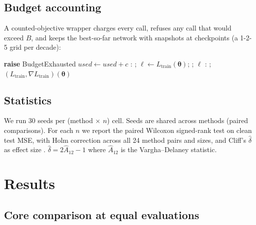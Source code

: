\documentclass[11pt]{article}
\newcommand{\B}{B}
\newcommand{\Ltr}{L_{\mathrm{train}}}
\begin{document}
\subsection{Budget accounting}

A counted-objective wrapper charges every call, refuses any call that would exceed $\B$, and keeps
the best-so-far network with snapshots at checkpoints (a 1-2-5 grid per decade):

\begin{algorithm}[h]
  \caption{Counted objective shared by all methods (sketch).}
  \small
  \begin{algorithmic}[1]
      \If{$\textit{used}+c>\B$} \textbf{raise} BudgetExhausted \EndIf
      \State $\textit{used}\gets\textit{used}+c$
    \EndFunction
    : ; $\ell\gets\Ltr(\bm\theta)$; ; \Return $\ell$ \EndFunction
    : ; \Return $(\Ltr,\nabla\Ltr)(\bm\theta)$ \EndFunction
  \end{algorithmic}
\end{algorithm}

\subsection{Statistics}

We run 30 seeds per (method $\times$ $n$) cell. Seeds are shared across methods (paired comparisons).
For each $n$ we report the paired Wilcoxon signed-rank test on clean test MSE, with Holm correction
across all 24 method pairs and sizes, and Cliff's $\hat\delta$ as effect size \citep{vargha2000,arcuri2011}.
$\hat\delta = 2\hat{A}_{12}-1$ where $\hat{A}_{12}$ is the Vargha--Delaney statistic.

\section{Results}
\label{sec:results}

\subsection{Core comparison at equal evaluations}
\end{document}
